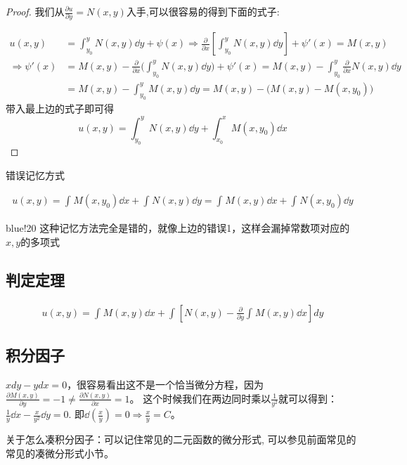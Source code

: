 \begin{proof}

我们从$\frac{\partial u}{\partial y}=N(x,y)$入手,可以很容易的得到下面的式子:

\begin{align*}
    u(x,y)&=\int_{y_0}^{y}{N(x,y) \dd y}+\psi(x)
        \Longrightarrow \frac{\partial}{\partial x}[\int_{y_0}^{y}{N(x,y) \dd y}]+\psi'(x)=M(x,y) \\
    \Longrightarrow  \psi'(x) 
    & = M(x,y)-\frac{\partial}{\partial x}\bigg(\int_{y_0}^{y}{N(x,y) \dd y}\bigg)+\psi'(x)
      = M(x,y)-\int_{y_0}^{y}{\frac{\partial}{\partial x}N(x,y) \dd y}\\
    & = M(x,y)-\int_{y_0}^{y}{M(x,y) \dd y}
      = M(x, y)-\bigg(M(x,y)-M(x,y_0)\bigg)
\end{align*} 
带入最上边的式子即可得
\[
    u(x,y)=\int_{y_0}^{y}{N(x,y) \dd y}+\int_{x_0}^{x}{M(x,y_0) \dd x}    
\]
\end{proof}

\textsf{错误记忆方式}

\begin{align*}
    u(x,y) = \int_{}^{}{M(x,y_0) \dd x}+\int_{}^{}{N(x,y) \dd y}
           = \int_{}^{}{M(x,y) \dd x}+\int_{}^{}{N(x,y_0) \dd y}
\end{align*} 


\begin{formal}{blue!20}
    这种记忆方法完全是错的，就像上边的错误1，这样会漏掉常数项对应的$x,y$的多项式
\end{formal}


\clearpage
\subsection{判定定理}
\begin{proposition}[判定定理]
\begin{align}   
    u(x, y) = \int_{}^{}{M(x, y) \dd x} + \int_{}^{}{[N(x, y)-\frac{\partial}{\partial y}\int_{}^{}{M(x, y) \dd x}] dy} 
\end{align}         
\end{proposition} 


\subsection{积分因子}
\begin{framed}


$xdy-ydx=0$，很容易看出这不是一个恰当微分方程，因为$\frac{\partial M(x, y)}{\partial y}=-1\neq \frac{\partial N(x, y)}{\partial x}=1$。
这个时候我们在两边同时乘以$\frac{1}{y^2}$就可以得到：$\frac{1}{y}\dd x-\frac{x}{y^2}\dd y=0$.
即$\dd(\frac{x}{y})=0\Longrightarrow \frac{x}{y}=C$。

关于怎么凑积分因子：可以记住常见的二元函数的微分形式, 可以参见前面常见的\textsf{常见的凑微分形式}小节。
\end{framed}

